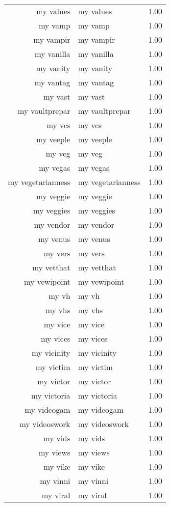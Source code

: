 \begin{table}[ht]
\begin{tabular}{rlr}
  my values & my values & 1.00 \\ 
  my vamp & my vamp & 1.00 \\ 
  my vampir & my vampir & 1.00 \\ 
  my vanilla & my vanilla & 1.00 \\ 
  my vanity & my vanity & 1.00 \\ 
  my vantag & my vantag & 1.00 \\ 
  my vast & my vast & 1.00 \\ 
  my vaultprepar & my vaultprepar & 1.00 \\ 
  my vcs & my vcs & 1.00 \\ 
  my veeple & my veeple & 1.00 \\ 
  my veg & my veg & 1.00 \\ 
  my vegas & my vegas & 1.00 \\ 
  my vegetarianness & my vegetarianness & 1.00 \\ 
  my veggie & my veggie & 1.00 \\ 
  my veggies & my veggies & 1.00 \\ 
  my vendor & my vendor & 1.00 \\ 
  my venus & my venus & 1.00 \\ 
  my vers & my vers & 1.00 \\ 
  my vetthat & my vetthat & 1.00 \\ 
  my vewipoint & my vewipoint & 1.00 \\ 
  my vh & my vh & 1.00 \\ 
  my vhs & my vhs & 1.00 \\ 
  my vice & my vice & 1.00 \\ 
  my vices & my vices & 1.00 \\ 
  my vicinity & my vicinity & 1.00 \\ 
  my victim & my victim & 1.00 \\ 
  my victor & my victor & 1.00 \\ 
  my victoria & my victoria & 1.00 \\ 
  my videogam & my videogam & 1.00 \\ 
  my videoswork & my videoswork & 1.00 \\ 
  my vids & my vids & 1.00 \\ 
  my views & my views & 1.00 \\ 
  my vike & my vike & 1.00 \\ 
  my vinni & my vinni & 1.00 \\ 
  my viral & my viral & 1.00 \\ 

\end{tabular}
\end{table}
